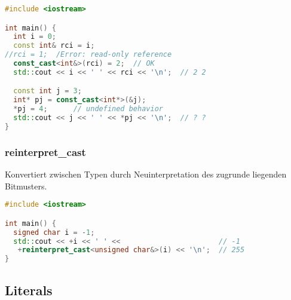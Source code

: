 \documentclass[10pt,twocolumn]{scrartcl}
\begin{document}
\begin{lstlisting}[language=C++]
#include <iostream>

int main() {
  int i = 0;
  const int& rci = i;
//rci = 1;  /Error: read-only reference
  const_cast<int&>(rci) = 2;  // OK
  std::cout << i << ' ' << rci << '\n';  // 2 2

  const int j = 3;
  int* pj = const_cast<int*>(&j);
  *pj = 4;      // undefined behavior
  std::cout << j << ' ' << *pj << '\n';  // ? ?
}
\end{lstlisting}

\subsubsection{reinterpret\_cast}

Konvertiert zwischen Typen durch Neuinterpretation des zugrunde liegenden
Bitmusters.

\begin{lstlisting}[language=C++]
#include <iostream>

int main() {
  signed char i = -1;
  std::cout << +i << ' ' <<                       // -1
   +reinterpret_cast<unsigned char&>(i) << '\n';  // 255
}
\end{lstlisting}

\subsection{Literals}
\end{document}
